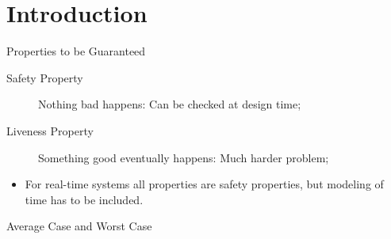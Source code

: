 \section{Introduction}

\begin{frame}{Properties to be Guaranteed}
  
\begin{description}
\item[Safety Property] Nothing bad happens: Can be checked at design time;
\item[Liveness Property] Something good eventually happens: Much
  harder problem;
\end{description}
\begin{itemize}
\item For real-time systems all properties are safety properties, but
  modeling of time has to be included.
\end{itemize}
\end{frame}

\begin{frame}{Average Case and Worst Case}
\end{frame}


